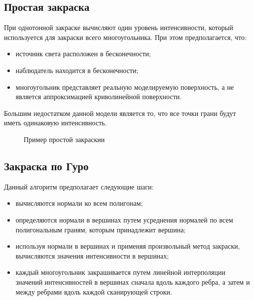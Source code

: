 \subsection{Простая закраска}

При однотонной закраске вычисляют один уровень интенсивности, который используется для закраски всего многоугольника. При этом предполагается, что:
\begin{itemize}
	\item источник света расположен в бесконечности;
	\item наблюдатель находится в бесконечности;
	\item многоугольник представляет реальную моделируемую поверхность, а не является аппроксимацией криволинейной поверхности.
\end{itemize}

Большим недостатком данной модели является то, что все точки грани будут иметь одинаковую интенсивность.

\begin{figure}[ph!]
	\caption{Пример простой закраскии}
	\label{fig:draw_simple}
\end{figure}

\clearpage

\subsection{Закраска по Гуро}

Данный алгоритм предполагает следующие шаги:
\begin{itemize}
	\item вычисляются нормали ко всем полигонам;
	\item определяются нормали в вершинах путем усреднения нормалей по всем полигональным граням, которым принадлежит вершина;
	\item используя нормали в вершинах и применяя произвольный метод закраски, вычисляются значения интенсивности в вершинах;
	\item каждый многоугольник закрашивается путем линейной интерполяции значений интенсивностей в вершинах сначала вдоль каждого ребра, а затем и между ребрами вдоль каждой сканирующей строки.
\end{itemize}

